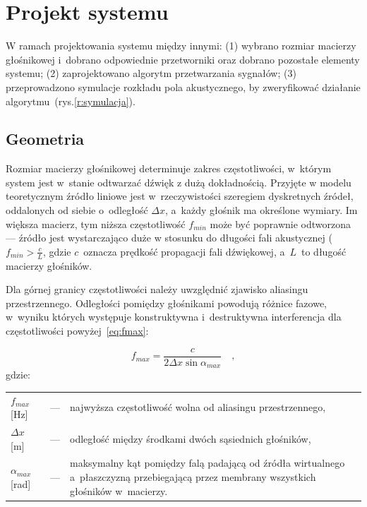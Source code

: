 \documentclass[10pt, a4paper]{article}
\let\Oldsection\section
\renewcommand{\section}{\FloatBarrier\Oldsection}
\let\Oldsubsection\subsection
\renewcommand{\subsection}{\FloatBarrier\Oldsubsection}
\begin{document}
\section{Projekt systemu}

W ramach projektowania systemu między innymi: (1) wybrano rozmiar macierzy
głośnikowej i~dobrano odpowiednie przetworniki oraz dobrano pozostałe elementy
systemu; (2) zaprojektowano algorytm przetwarzania sygnałów; (3) przeprowadzono
symulacje rozkładu pola akustycznego, by zweryfikować działanie algorytmu~(rys.\ref{r:symulacja}).

\subsection{Geometria}

Rozmiar macierzy głośnikowej determinuje zakres częstotliwości, w~którym system
jest w~stanie odtwarzać dźwięk z dużą dokładnością. Przyjęte w modelu teoretycznym 
źródło liniowe jest w~rzeczywistości szeregiem dyskretnych źródeł, oddalonych od siebie 
o~odległość $\Delta x$, a~każdy głośnik ma określone wymiary. Im większa macierz, tym niższa
częstotliwość $f_{min}$ może być poprawnie odtworzona --- źródło jest wystarczająco duże w stosunku 
do długości fali akustycznej ($f_{min}>\frac{c}{L}$, gdzie $c$~oznacza prędkość propagacji fali dźwiękowej,
a~$L$~to długość macierzy głośników.

Dla górnej granicy częstotliwości należy uwzględnić zjawisko aliasingu
przestrzennego. Odległości pomiędzy głośnikami powodują różnice fazowe, w~wyniku których 
występuje konstruktywna i~destruktywna interferencja dla częstotliwości powyżej~\eqref{eq:fmax}:

\begin{equation}
  f_{max}=\frac{c}{2\Delta x \sin{\alpha_{max}}} \quad, \label{eq:fmax}
\end{equation}
gdzie:\\
\indent \begin{tabular}{l c p{}}
  $f_{max}$ [\si{\hertz}] & --- & najwyższa częstotliwość wolna od aliasingu przestrzennego, \\
  $\Delta x$ [\si{\metre}] & --- & odległość między środkami dwóch sąsiednich głośników, \\
  $\alpha_{max}$ [\si{\radian}] & --- & maksymalny kąt pomiędzy falą padającą od źródła 
wirtualnego a~płaszczyzną przebiegającą przez membrany wszystkich głośników w~macierzy.\\
\end{tabular}\\
\end{document}
